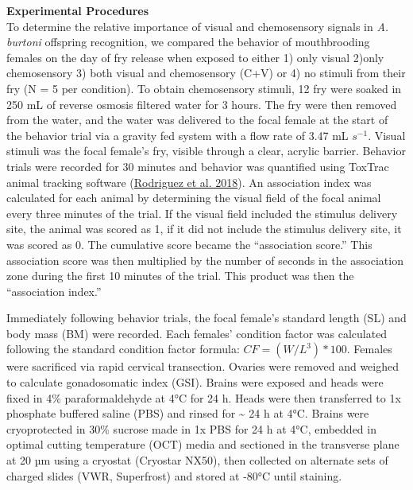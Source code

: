 \documentclass[
  12pt,
]{article}
\begin{document}
\textbf{Experimental Procedures}\\
To determine the relative importance of visual and chemosensory signals in \emph{A. burtoni} offspring recognition, we compared the behavior of mouthbrooding females on the day of fry release when exposed to either 1) only visual 2)only chemosensory 3) both visual and chemosensory (C+V) or 4) no stimuli from their fry (N = 5 per condition). To obtain chemosensory stimuli, 12 fry were soaked in 250 mL of reverse osmosis filtered water for 3 hours. The fry were then removed from the water, and the water was delivered to the focal female at the start of the behavior trial via a gravity fed system with a flow rate of 3.47 mL \(s^{-1}\). Visual stimuli was the focal female's fry, visible through a clear, acrylic barrier. Behavior trials were recorded for 30 minutes and behavior was quantified using ToxTrac animal tracking software (\protect\hyperlink{ref-RN16}{Rodriguez et al. 2018}). An association index was calculated for each animal by determining the visual field of the focal animal every three minutes of the trial. If the visual field included the stimulus delivery site, the animal was scored as 1, if it did not include the stimulus delivery site, it was scored as 0. The cumulative score became the ``association score.'' This association score was then multiplied by the number of seconds in the association zone during the first 10 minutes of the trial. This product was then the ``association index.''

Immediately following behavior trials, the focal female's standard length (SL) and body mass (BM) were recorded. Each females' condition factor was calculated following the standard condition factor formula: \(CF = (W/L^3)*100\). Females were sacrificed via rapid cervical transection. Ovaries were removed and weighed to calculate gonadosomatic index (GSI). Brains were exposed and heads were fixed in 4\% paraformaldehyde at 4°C for 24 h. Heads were then transferred to 1x phosphate buffered saline (PBS) and rinsed for \textasciitilde{} 24 h at 4°C. Brains were cryoprotected in 30\% sucrose made in 1x PBS for 24 h at 4°C, embedded in optimal cutting temperature (OCT) media and sectioned in the transverse plane at 20 µm using a cryostat (Cryostar NX50), then collected on alternate sets of charged slides (VWR, Superfrost) and stored at -80°C until staining.
\end{document}
